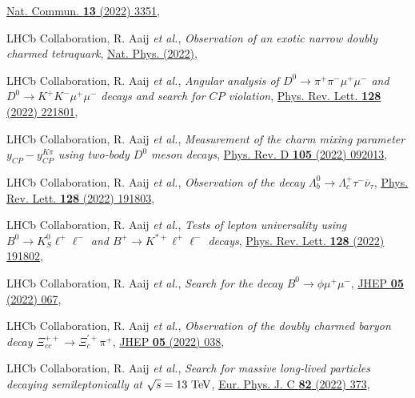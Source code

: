 \begin{cvcontent}
\begin{enumerate}[label={[\arabic*]}, leftmargin=1.5cm]
    \href{https://doi.org/10.1038/s41467-022-30206-w}{Nat. Commun. \textbf{13} (2022) 3351},
    \item LHCb Collaboration, R. Aaij \emph{et al.}, 
    \emph{Observation of an exotic narrow doubly charmed tetraquark},
    \href{https://doi.org/10.1038/s41567-022-01614-y}{Nat. Phys. (2022)},
    \sloppy
    \item LHCb Collaboration, R. Aaij \emph{et al.}, 
    \emph{Angular analysis of $D^0 \to \pi^+\pi^-\mu^+\mu^-$ and $D^0 \to K^+K^-\mu^+\mu^-$ decays and search for $CP$ violation},
    \href{https://link.aps.org/doi/10.1103/PhysRevLett.128.221801}{Phys. Rev. Lett. \textbf{128} (2022) 221801},
    \item LHCb Collaboration, R. Aaij \emph{et al.},
    \emph{Measurement of the charm mixing parameter $y_{CP} - y_{CP}^{K\pi}$ using two-body $D^0$ meson decays},
    \href{https://link.aps.org/doi/10.1103/PhysRevD.105.092013}{Phys. Rev. D \textbf{105} (2022) 092013},
    \item LHCb Collaboration, R. Aaij \emph{et al.}, 
    \emph{Observation of the decay $\Lambda_b^0 \rightarrow \Lambda_c^+\tau^-\overline{\nu}_{\tau}$},
    \href{https://link.aps.org/doi/10.1103/PhysRevLett.128.191803}{Phys. Rev. Lett. \textbf{128} (2022) 191803},
    \item LHCb Collaboration, R. Aaij \emph{et al.}, 
    \emph{Tests of lepton universality using $B^0\to K^0_S \ell^+ \ell^-$ and $B^+\to K^{*+}\ell^+\ell^-$ decays},
    \href{https://link.aps.org/doi/10.1103/PhysRevLett.128.191802}{Phys. Rev. Lett. \textbf{128} (2022) 191802},
    \item LHCb Collaboration, R. Aaij \emph{et al.},
    \emph{Search for the decay $B^0\to\phi\mu^+\mu^-$},
    \href{https://doi.org/10.1007/JHEP05(2022)067}{JHEP \textbf{05} (2022) 067},
    \item LHCb Collaboration, R. Aaij \emph{et al.},
    \emph{Observation of the doubly charmed baryon decay $\Xi_{cc}^{++}\to \Xi_{c}^{'+}\pi^{+}$},
    \href{https://doi.org/10.1007/JHEP05(2022)038}{JHEP \textbf{05} (2022) 038},
    \item LHCb Collaboration, R. Aaij \emph{et al.}, 
    \emph{Search for massive long-lived particles decaying semileptonically at $\sqrt{s} = 13~\rm{TeV}$},
    \href{https://doi.org/10.1140/epjc/s10052-022-10186-3}{Eur. Phys. J. C \textbf{82} (2022) 373},

\end{enumerate}
\end{cvcontent}

